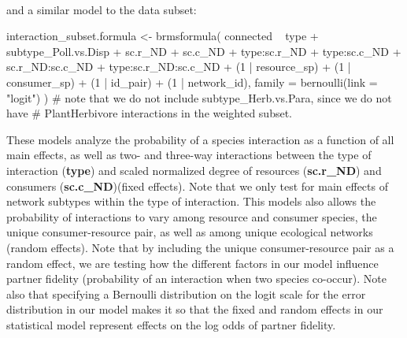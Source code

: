 \documentclass[11pt,]{article}
\newenvironment{Shaded}{}{}
\newcommand{\KeywordTok}[1]{\textcolor[rgb]{0.00,0.00,1.00}{#1}}
\newcommand{\DataTypeTok}[1]{#1}
\newcommand{\DecValTok}[1]{#1}
\newcommand{\StringTok}[1]{\textcolor[rgb]{0.00,0.50,0.50}{#1}}
\newcommand{\CommentTok}[1]{\textcolor[rgb]{0.00,0.50,0.00}{#1}}
\newcommand{\OperatorTok}[1]{#1}
\newcommand{\NormalTok}[1]{#1}
\begin{document}
~

and a similar model to the data subset:

\begin{Shaded}
\begin{Highlighting}[]
\NormalTok{interaction_subset.formula <-}\StringTok{ }\KeywordTok{brmsformula}\NormalTok{(}
\NormalTok{  connected }\OperatorTok{~}\StringTok{ }\NormalTok{type }\OperatorTok{+}\StringTok{ }\NormalTok{subtype_Poll.vs.Disp }\OperatorTok{+}\StringTok{ }\NormalTok{sc.r_ND }\OperatorTok{+}\StringTok{ }\NormalTok{sc.c_ND }\OperatorTok{+}\StringTok{ }
\StringTok{    }\NormalTok{type}\OperatorTok{:}\NormalTok{sc.r_ND }\OperatorTok{+}\StringTok{ }\NormalTok{type}\OperatorTok{:}\NormalTok{sc.c_ND }\OperatorTok{+}\StringTok{ }\NormalTok{sc.r_ND}\OperatorTok{:}\NormalTok{sc.c_ND }\OperatorTok{+}
\StringTok{    }\NormalTok{type}\OperatorTok{:}\NormalTok{sc.r_ND}\OperatorTok{:}\NormalTok{sc.c_ND }\OperatorTok{+}
\StringTok{    }\NormalTok{(}\DecValTok{1} \OperatorTok{|}\StringTok{ }\NormalTok{resource_sp) }\OperatorTok{+}\StringTok{ }\NormalTok{(}\DecValTok{1} \OperatorTok{|}\StringTok{ }\NormalTok{consumer_sp) }\OperatorTok{+}\StringTok{ }\NormalTok{(}\DecValTok{1} \OperatorTok{|}\StringTok{ }\NormalTok{id_pair) }\OperatorTok{+}\StringTok{ }\NormalTok{(}\DecValTok{1} \OperatorTok{|}\StringTok{ }\NormalTok{network_id),}
  \DataTypeTok{family =} \KeywordTok{bernoulli}\NormalTok{(}\DataTypeTok{link =} \StringTok{"logit"}\NormalTok{) }
\NormalTok{) }\CommentTok{# note that we do not include subtype_Herb.vs.Para, since we do not have}
\CommentTok{# PlantHerbivore interactions in the weighted subset.}
\end{Highlighting}
\end{Shaded}

These models analyze the probability of a species interaction as a
function of all main effects, as well as two- and three-way interactions
between the type of interaction (\textbf{type}) and scaled normalized
degree of resources (\textbf{sc.r\_ND}) and consumers
(\textbf{sc.c\_ND})(fixed effects). Note that we only test for main
effects of network subtypes within the type of interaction. This models
also allows the probability of interactions to vary among resource and
consumer species, the unique consumer-resource pair, as well as among
unique ecological networks (random effects). Note that by including the
unique consumer-resource pair as a random effect, we are testing how the
different factors in our model influence partner fidelity (probability
of an interaction when two species co-occur). Note also that specifying
a Bernoulli distribution on the logit scale for the error distribution
in our model makes it so that the fixed and random effects in our
statistical model represent effects on the log odds of partner fidelity.
\end{document}
